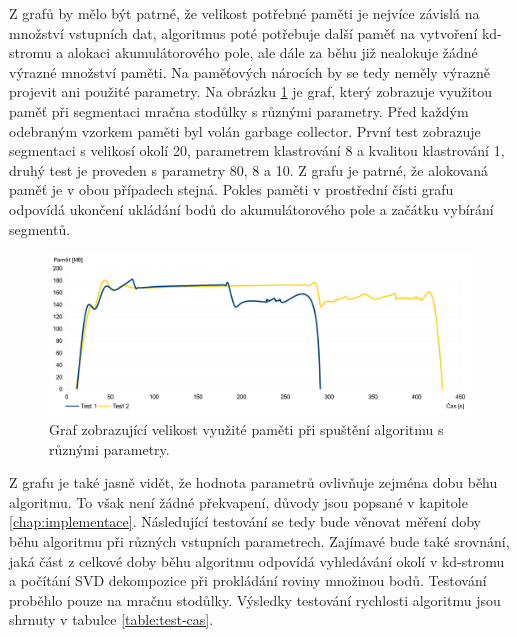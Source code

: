 \documentclass[11pt,twoside,a4paper]{book}
\begin{document}
Z grafů by mělo být patrné, že velikost potřebné paměti je nejvíce závislá na množství vstupních dat, algoritmus poté potřebuje další paměť na vytvoření kd-stromu a alokaci akumulátorového pole, ale dále za běhu již nealokuje žádné výrazné množství paměti. Na paměťových nárocích by se tedy neměly výrazně projevit ani použité parametry. Na obrázku \ref{fig:memory-graf2} je graf, který zobrazuje využitou paměť při segmentaci mračna stodůlky s různými parametry. Před každým odebraným vzorkem paměti byl volán garbage collector. První test zobrazuje segmentaci s velikosí okolí 20, parametrem klastrování 8 a kvalitou klastrování 1, druhý test je proveden s parametry 80, 8 a 10. Z grafu je patrné, že alokovaná paměť je v obou případech stejná. Pokles paměti v prostřední čísti grafu odpovídá ukončení ukládání bodů do akumulátorového pole a začátku vybírání segmentů.

\begin{figure}[ht]
\begin{center}
\includegraphics[width=\textwidth]{figures/memory-graf2}
\caption{Graf zobrazující velikost využité paměti při spuštění algoritmu s různými parametry.}
\label{fig:memory-graf2}
\end{center}
\end{figure}

Z grafu je také jasně vidět, že hodnota parametrů ovlivňuje zejména dobu běhu algoritmu. To však není žádné překvapení, důvody jsou popsané v kapitole \ref{chap:implementace}. Následující testování se tedy bude věnovat měření doby běhu algoritmu při různých vstupních parametrech. Zajímavé bude také srovnání, jaká část z celkové doby běhu algoritmu odpovídá vyhledávání okolí v kd-stromu a počítání SVD dekompozice při prokládání roviny množinou bodů. Testování proběhlo pouze na mračnu stodůlky. Výsledky testování rychlosti algoritmu jsou shrnuty v tabulce \ref{table:test-cas}.
\end{document}
